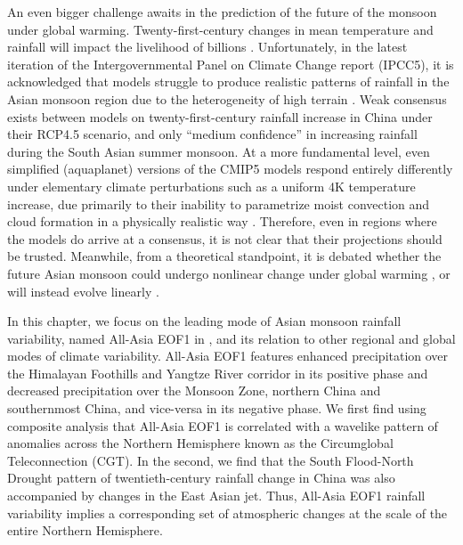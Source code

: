 	An even bigger challenge awaits in the prediction of the future of the monsoon under global warming. Twenty-first-century changes in mean temperature and rainfall will impact the livelihood of billions \citep{Barrios2010,Burke2015}. Unfortunately, in the latest iteration of the Intergovernmental Panel on Climate Change report (IPCC5), it is acknowledged that models struggle to produce realistic patterns of rainfall in the Asian monsoon region due to the heterogeneity of high terrain \citep{Christensen2011}. Weak consensus exists between models on twenty-first-century rainfall increase in China under their RCP4.5 scenario, and only ``medium confidence'' in increasing rainfall during the South Asian summer monsoon. At a more fundamental level, even simplified (aquaplanet) versions of the CMIP5 models respond entirely differently under elementary climate perturbations such as a uniform 4K temperature increase, due primarily to their inability to parametrize moist convection and cloud formation in a physically realistic way \citep{Stevens2013}. Therefore, even in regions where the models do arrive at a consensus, it is not clear that their projections should be trusted. Meanwhile, from a theoretical standpoint, it is debated whether the future Asian monsoon could undergo nonlinear change under global warming \citep{Zickfeld2005}, or will instead evolve linearly \citep{Boos2016}.
	
	In this chapter, we focus on the leading mode of Asian monsoon rainfall variability, named All-Asia EOF1 in \citet{Day2015}, and its relation to other regional and global modes of climate variability. All-Asia EOF1 features enhanced precipitation over the Himalayan Foothills and Yangtze River corridor in its positive phase and decreased precipitation over the Monsoon Zone, northern China and southernmost China, and vice-versa in its negative phase. We first find using composite analysis that All-Asia EOF1 is correlated with a wavelike pattern of anomalies across the Northern Hemisphere known as the Circumglobal Teleconnection (CGT). In the second, we find that the South Flood-North Drought pattern of twentieth-century rainfall change in China was also accompanied by changes in the East Asian jet. Thus, All-Asia EOF1 rainfall variability implies a corresponding set of atmospheric changes at the scale of the entire Northern Hemisphere.
	
